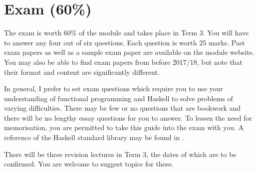 \section{Exam (60\%)}

The exam is worth 60\% of the module and takes place in Term 3. You will have to answer any four out of six questions. Each question is worth 25 marks. Past exam papers as well as a sample exam paper are available on the module website. You may also be able to find exam papers from before 2017/18, but note that their format and content are significantly different.

In general, I prefer to set exam questions which require you to use your understanding of functional programming and Haskell to solve problems of varying difficulties. There may be few or no questions that are bookwork and there will be no lengthy essay questions for you to answer. To lessen the need for memorisation, you are permitted to take this guide into the exam with you. A reference of the Haskell standard library may be found in .

There will be three revision lectures in Term 3, the dates of which are to be confirmed. You are welcome to suggest topics for these.